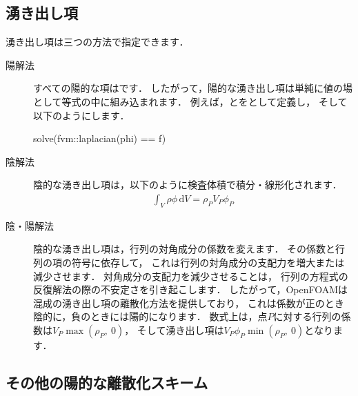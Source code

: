 \subsection{湧き出し項}
\label{ssec:2.4.9}
湧き出し項は三つの方法で指定できます．
\begin{description}
 \item[陽解法] すべての陽的な項はです．
            したがって，陽的な湧き出し項は単純に値の場として等式の中に組み込まれます．
            例えば，とをとして定義し，
            そして以下のようにします．
            \begin{OFverbatim}[file]
solve(fvm::laplacian(phi) == f)
            \end{OFverbatim}
 \item[陰解法] 陰的な湧き出し項は，以下のように検査体積で積分・線形化されます．
            \begin{align}
             \label{eq:2.29}
             \int_{V}\rho\phi\,\mathrm{d}V = \rho_{P}V_{P}\phi_{P}
            \end{align}
 \item[陰・陽解法] 陰的な湧き出し項は，行列の対角成分の係数を変えます．
            その係数と行列の項の符号に依存して，
            これは行列の対角成分の支配力を増大または減少させます．
            対角成分の支配力を減少させることは，
            行列の方程式の反復解法の際の不安定さを引き起こします．
            したがって，OpenFOAMは混成の湧き出し項の離散化方法を提供しており，
            これは係数が正のとき陰的に，負のときには陽的になります．
            数式上は，点$P$に対する行列の係数は$V_{P}\max(\rho_{P},\ 0)$，
            そして湧き出し項は$V_{P}\phi_{P}\min(\rho_{P},\ 0)$となります．
\end{description}


\subsection{その他の陽的な離散化スキーム}
\label{ssec:2.4.10}

